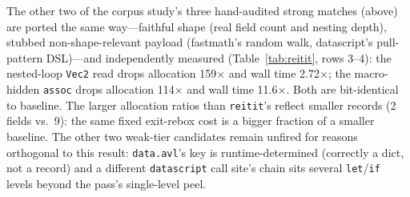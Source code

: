\documentclass[sigplan,screen,review,anonymous]{acmart}
\begin{document}
The other two of the corpus study's three hand-audited strong matches
(above) are ported the same way---faithful shape (real field count and
nesting depth), stubbed non-shape-relevant payload (fastmath's random
walk, datascript's pull-pattern DSL)---and independently measured
(Table~\ref{tab:reitit}, rows 3--4): the nested-loop \texttt{Vec2} read
drops allocation 159$\times$ and wall time 2.72$\times$; the
macro-hidden \texttt{assoc} drops allocation 114$\times$ and wall time
11.6$\times$. Both are bit-identical to baseline. The larger allocation
ratios than \texttt{reitit}'s reflect smaller records (2 fields vs.\ 9):
the same fixed exit-rebox cost is a bigger fraction of a smaller
baseline. The other two weak-tier candidates remain unfired for reasons
orthogonal to this result:
\texttt{data.avl}'s key is runtime-determined (correctly a dict, not a
record) and a different \texttt{datascript} call site's chain sits several
\texttt{let}/\texttt{if} levels beyond the pass's single-level peel.
\end{document}
